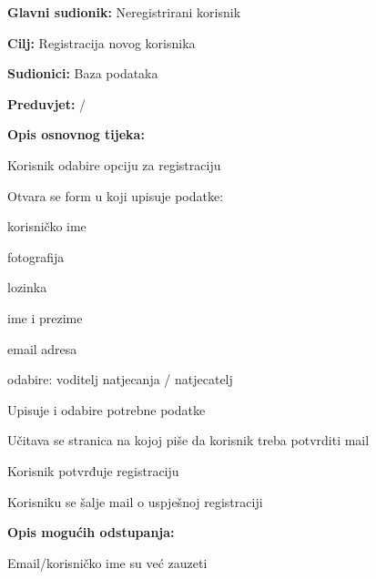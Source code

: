						\noindent {}
					\begin{packed_item}
						
						\item \textbf{Glavni sudionik: } Neregistrirani korisnik
						\item  \textbf{Cilj:} Registracija novog korisnika
						\item  \textbf{Sudionici:} Baza podataka
						\item  \textbf{Preduvjet:}  / 
						\item  \textbf{Opis osnovnog tijeka:}
						
						\item[] \begin{packed_enum}
							\item Korisnik odabire opciju za registraciju
							\item Otvara se form u koji upisuje podatke:
							\item[] \begin{packed_enum}
								
								\item korisničko ime
								\item fotografija
								\item lozinka
								\item ime i prezime
								\item email adresa
								\item odabire: voditelj natjecanja / natjecatelj
								
							\end{packed_enum}
							\item Upisuje i odabire potrebne podatke			
							\item Učitava se stranica na kojoj piše da korisnik treba potvrditi mail
							\item Korisnik potvrđuje registraciju
							\item Korisniku se šalje mail o uspješnoj registraciji
						\end{packed_enum}
						
						\item  \textbf{Opis mogućih odstupanja:}
						
						\item[] \begin{packed_item}
							
							\item[2.a]Email/korisničko ime su već zauzeti
							\item[] \begin{packed_enum}
								

\end{packed_enum}
\end{packed_item}
\end{packed_item}
